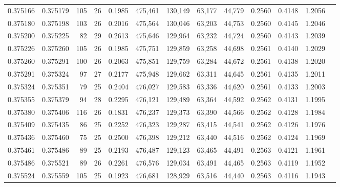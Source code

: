 \begin{tabular}{rrrrrrrrrrrrr}
0.375166 & 0.375179 &   105 &  26 &                                     0.1985 & 475,461 & 130,149 &  63,177 &  44,779 & 0.2560 & 0.4148 & 1.2056 \\
0.375180 & 0.375198 &   103 &  26 &                                     0.2016 & 475,564 & 130,046 &  63,203 &  44,753 & 0.2560 & 0.4145 & 1.2046 \\
0.375200 & 0.375225 &    82 &  29 &                                     0.2613 & 475,646 & 129,964 &  63,232 &  44,724 & 0.2560 & 0.4143 & 1.2039 \\
0.375226 & 0.375260 &   105 &  26 &                                     0.1985 & 475,751 & 129,859 &  63,258 &  44,698 & 0.2561 & 0.4140 & 1.2029 \\
0.375260 & 0.375291 &   100 &  26 &                                     0.2063 & 475,851 & 129,759 &  63,284 &  44,672 & 0.2561 & 0.4138 & 1.2020 \\
0.375291 & 0.375324 &    97 &  27 &                                     0.2177 & 475,948 & 129,662 &  63,311 &  44,645 & 0.2561 & 0.4135 & 1.2011 \\
0.375324 & 0.375351 &    79 &  25 &                                     0.2404 & 476,027 & 129,583 &  63,336 &  44,620 & 0.2561 & 0.4133 & 1.2003 \\
0.375355 & 0.375379 &    94 &  28 &                                     0.2295 & 476,121 & 129,489 &  63,364 &  44,592 & 0.2562 & 0.4131 & 1.1995 \\
0.375380 & 0.375406 &   116 &  26 &                                     0.1831 & 476,237 & 129,373 &  63,390 &  44,566 & 0.2562 & 0.4128 & 1.1984 \\
0.375409 & 0.375435 &    86 &  25 &                                     0.2252 & 476,323 & 129,287 &  63,415 &  44,541 & 0.2562 & 0.4126 & 1.1976 \\
0.375436 & 0.375460 &    75 &  25 &                                     0.2500 & 476,398 & 129,212 &  63,440 &  44,516 & 0.2562 & 0.4124 & 1.1969 \\
0.375461 & 0.375486 &    89 &  25 &                                     0.2193 & 476,487 & 129,123 &  63,465 &  44,491 & 0.2563 & 0.4121 & 1.1961 \\
0.375486 & 0.375521 &    89 &  26 &                                     0.2261 & 476,576 & 129,034 &  63,491 &  44,465 & 0.2563 & 0.4119 & 1.1952 \\
0.375524 & 0.375559 &   105 &  25 &                                     0.1923 & 476,681 & 128,929 &  63,516 &  44,440 & 0.2563 & 0.4116 & 1.1943 \\

\end{tabular}
